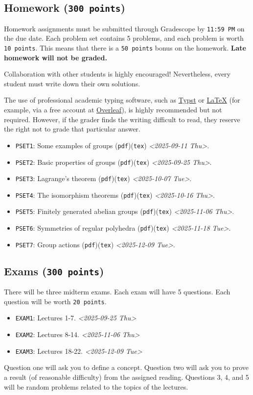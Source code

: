 \documentclass[11pt]{article}
\begin{document}
\subsection{Homework (\texttt{300 points})}
\label{sec:org69fe62a}
Homework assignments must be submitted through Gradescope by \texttt{11:59 PM} on the
due date. Each problem set contains 5 problems, and each problem is worth \texttt{10
points}. This means that there is a \texttt{50 points} bonus on the homework. \textbf{Late
homework will not be graded.}

Collaboration with other students is highly encouraged! Nevertheless, every
student must write down their own solutions.

The use of professional academic typing software, such as \href{https://typst.app/}{Typst} or
\href{https://www.latex-project.org/}{\LaTeX{}} (for example, via a free account at \href{https://www.overleaf.com}{Overleaf}), is highly recommended
but not required. However, if the grader finds the writing difficult to read,
they reserve the right not to grade that particular answer.


\begin{itemize}
\item \texttt{PSET1}: Some examples of groups (\texttt{pdf})(\texttt{tex}) \textit{<2025-09-11 Thu>}.
\item \texttt{PSET2}: Basic properties of groups (\texttt{pdf})(\texttt{tex}) \textit{<2025-09-25 Thu>}.
\item \texttt{PSET3}: Lagrange's theorem (\texttt{pdf})(\texttt{tex}) \textit{<2025-10-07 Tue>}.
\item \texttt{PSET4}: The isomorphism theorems (\texttt{pdf})(\texttt{tex}) \textit{<2025-10-16 Thu>}.
\item \texttt{PSET5}: Finitely generated abelian groups (\texttt{pdf})(\texttt{tex}) \textit{<2025-11-06 Thu>}.
\item \texttt{PSET6}: Symmetries of regular polyhedra (\texttt{pdf})(\texttt{tex}) \textit{<2025-11-18 Tue>}.
\item \texttt{PSET7}: Group actions (\texttt{pdf})(\texttt{tex}) \textit{<2025-12-09 Tue>}.
\end{itemize}

\subsection{Exams (\texttt{300 points})}
\label{sec:orgc8386eb}
There will be three midterm exams. Each exam will have 5 questions. Each question will
be worth \texttt{20 points}.
\begin{itemize}
\item \texttt{EXAM1}: Lectures 1-7. \textit{<2025-09-25 Thu>}
\item \texttt{EXAM2}: Lectures 8-14. \textit{<2025-11-06 Thu>}
\item \texttt{EXAM3}: Lectures 18-22. \textit{<2025-12-09 Tue>}
\end{itemize}
Question one will ask you to define a concept. Question two will ask you to
prove a result (of reasonable difficulty) from the assigned reading. Questions
3, 4, and 5 will be random problems related to the topics of the lectures.
\end{document}

